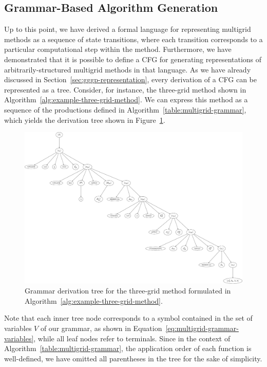 \subsection{Grammar-Based Algorithm Generation}
\label{sec:grammar-based-algorithm-generation}
Up to this point, we have derived a formal language for representing multigrid methods as a sequence of state transitions, where each transition corresponds to a particular computational step within the method.
Furthermore, we have demonstrated that it is possible to define a CFG for generating representations of arbitrarily-structured multigrid methods in that language.
As we have already discussed in Section~\ref{sec:gggp-representation}, every derivation of a CFG can be represented as a tree.
Consider, for instance, the three-grid method shown in Algorithm~\ref{alg:example-three-grid-method}.
We can express this method as a sequence of the productions defined in Algorithm~\ref{table:multigrid-grammar}, which yields the derivation tree shown in Figure~\ref{fig:example-three-grid-method-derivation-tree}.
\begin{figure}
	\centering
	\includegraphics[width=\textwidth]{figures/trees/three_grid_method_grammar_tree.pdf}
	\caption{Grammar derivation tree for the three-grid method formulated in Algorithm~\ref{alg:example-three-grid-method}.}
	\label{fig:example-three-grid-method-derivation-tree}
\end{figure}
Note that each inner tree node corresponds to a symbol contained in the set of variables $V$ of our grammar, as shown in Equation~\eqref{eq:multigrid-grammar-variables}, while all leaf nodes refer to terminals.
Since in the context of Algorithm~\ref{table:multigrid-grammar}, the application order of each function is well-defined, we have omitted all parentheses in the tree for the sake of simplicity.

